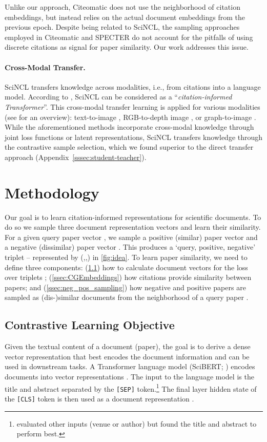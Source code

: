 \documentclass[11pt]{article}
\newcommand{\sys}{SciNCL\xspace} \newcommand{\baselineCount}{10\xspace}
\def\centerfigure#1{\setbox\mybox\hbox{#1}\raisebox{-0.25\dimexpr\ht\mybox+\dp\mybox}{\copy\mybox}}
\def\centerstar#1{\setbox\mybox\hbox{#1}\raisebox{-0.15\dimexpr\ht\mybox+\dp\mybox}{\copy\mybox}}
\def\centerfigure#1{\setbox\mybox\hbox{#1}\raisebox{-0.25\dimexpr\ht\mybox+\dp\mybox}{\copy\mybox}}
\def\centerstar#1{\setbox\mybox\hbox{#1}\raisebox{-0.15\dimexpr\ht\mybox+\dp\mybox}{\copy\mybox}}
\newcommand*\posIcon{\scalebox{0.15}{
\centerfigure{\begin{tikzpicture}[]
     \draw[line width=0.75cm,black,align=center] (-1.1cm,-.5) -- (1.1cm,-0.5); \draw[line width=0.75cm,black,align=center] (0,-1.6cm) -- (0, 0.6cm);
     \draw[line width=0.5cm,hardPosColor,align=center] (-1cm,-.5) -- (1cm,-0.5); \draw[line width=0.5cm,hardPosColor,align=center] (0,-1.5cm) -- (0, 0.5cm);
\end{tikzpicture}}}\xspace}
\newcommand*\negIcon{\scalebox{0.15}{
\begin{tikzpicture}[]
    \draw[line width=0.5cm,white] (0,-.5cm) -- (0, .5cm);
    \draw[line width=0.75cm,black] (-1.1cm,0) -- (1.1cm,0); \draw[line width=0.5cm,easyNegColor] (-1cm,0) -- (1cm,0);
\end{tikzpicture}}\xspace}
\newcommand*\queryIcon{\scalebox{0.5}{
\centerstar{\begin{tikzpicture}[]
\node[draw=none, fill=queryColor, star, star points=5,star point ratio=2.25]  at (0,0) {};
\end{tikzpicture}}}\xspace}
\begin{document}
Unlike our approach, Citeomatic does not use the neighborhood of citation embeddings, but instead relies on the actual document embeddings from the previous epoch.
Despite being related to \sys, the sampling approaches employed in Citeomatic and SPECTER do not account for the pitfalls of using discrete citations as signal for paper similarity.
Our work addresses this issue.

\paragraph{Cross-Modal Transfer.} 
\sys transfers knowledge across modalities, i.e., from citations into a language model.
According to \citet{Cohan2020}, \sys can be considered as a ``\textit{citation-informed Transformer}''.
This cross-modal transfer learning is applied for various modalities (see \citet{Kaur2021} for an overview):
text-to-image \cite{Socher2013},
RGB-to-depth image \cite{Tian2020},
or graph-to-image \cite{Wang2018ZeroShotRV}.
While the aforementioned methods incorporate cross-modal knowledge through joint loss functions or latent representations,
\sys transfers knowledge through the contrastive sample selection, which we found  superior to the direct transfer approach  (Appendix~\ref{sssec:student-teacher}).





\section{Methodology} \label{sec:methodology}
Our goal is to learn citation-informed representations for scientific documents. To do so we sample three document representation vectors and learn their similarity. For a given query paper vector , we sample a positive (similar) paper vector  and a negative (dissimilar) paper vector . This produces a `query, positive, negative' triplet  -- represented by (\queryIcon,\posIcon,\negIcon) in \cref{fig:idea}. To learn paper similarity, we need to define three components: (\cref{ssec:cl-objective}) how to calculate document vectors  for the loss over triplets ; (\cref{ssec:CGEmbeddings}) how citations provide similarity between papers; and (\cref{ssec:neg_pos_sampling}) how negative and positive papers  are sampled as (dis-)similar documents from the neighborhood of a query paper .


\subsection{Contrastive Learning Objective} \label{ssec:cl-objective} Given the textual content of a document  (paper), the goal is to derive a dense vector representation  that best encodes the document information and can be used in downstream tasks.
A Transformer language model  (SciBERT; \citet{Beltagy2019}) encodes documents  into vector representations .
The input to the language model is the title and abstract separated by the \texttt{[SEP]} token.\footnote{\citet{Cohan2019} evaluated other inputs (venue or author) but found the title and abstract to perform best.}
The final layer hidden state of the \texttt{[CLS]} token is then used as a document representation .
\end{document}
